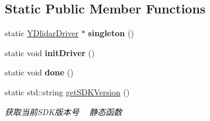 \subsection*{Static Public Member Functions}
\begin{DoxyCompactItemize}
\item 
static \hyperlink{classydlidar_1_1_y_dlidar_driver}{Y\+Dlidar\+Driver} $\ast$ {\bfseries singleton} ()\hypertarget{classydlidar_1_1_y_dlidar_driver_ae647504b6232c8fce584ca2d011a07d3}{}\label{classydlidar_1_1_y_dlidar_driver_ae647504b6232c8fce584ca2d011a07d3}

\item 
static void {\bfseries init\+Driver} ()\hypertarget{classydlidar_1_1_y_dlidar_driver_a15629ca7d39a463d1b18a5e35300dfe7}{}\label{classydlidar_1_1_y_dlidar_driver_a15629ca7d39a463d1b18a5e35300dfe7}

\item 
static void {\bfseries done} ()\hypertarget{classydlidar_1_1_y_dlidar_driver_a167ea8a27d77fae98488f1ba7f31969c}{}\label{classydlidar_1_1_y_dlidar_driver_a167ea8a27d77fae98488f1ba7f31969c}

\item 
static std\+::string \hyperlink{classydlidar_1_1_y_dlidar_driver_a542dc18ac8dbcda2a51657cf9bd44ae0}{get\+S\+D\+K\+Version} ()
\begin{DoxyCompactList}\small\item\em 获取当前\+S\+D\+K版本号 ~\newline
静态函数 \end{DoxyCompactList}\end{DoxyCompactItemize}
